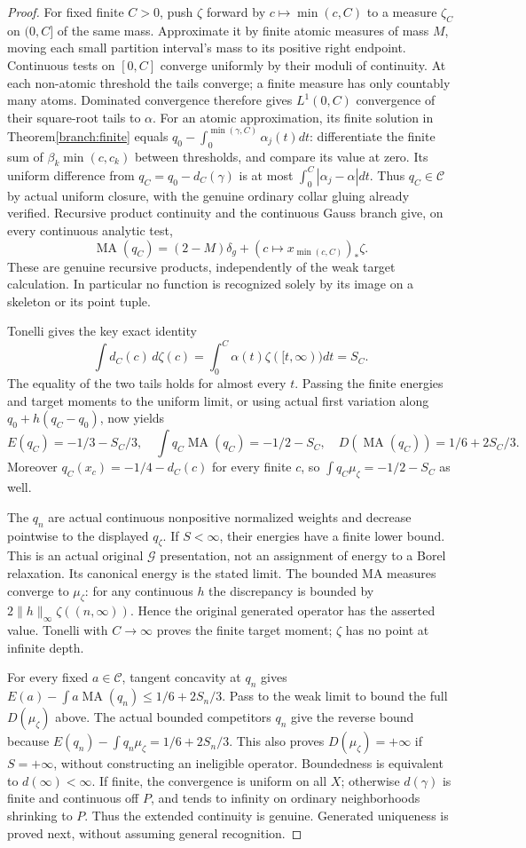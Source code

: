 \documentclass[11pt]{article}
\newcommand{\MA}{\operatorname{MA}}
\newcommand{\C}{\mathcal C}
\begin{document}
\begin{proof}
For fixed finite $C>0$, push $\zeta$ forward by $c\mapsto\min(c,C)$
to a measure $\zeta_C$ on $(0,C]$ of the same mass. Approximate it by
finite atomic measures of mass $M$, moving each small partition interval's
mass to its positive right endpoint. Continuous tests on $[0,C]$ converge
uniformly by their moduli of continuity. At each non-atomic threshold the
tails converge; a finite measure has only countably many atoms. Dominated
convergence therefore gives $L^1(0,C)$ convergence of their square-root
tails to $\alpha$. For an atomic approximation, its finite solution in
Theorem\ref{branch:finite} equals $q_0-\int_0^{\min(\gamma,C)}\alpha_j(t)dt$:
differentiate the finite sum of $\beta_k\min(c,c_k)$ between thresholds,
and compare its value at zero. Its uniform difference from
$q_C=q_0-d_C(\gamma)$ is at most $\int_0^C|\alpha_j-\alpha|dt$.
Thus $q_C\in\C$ by actual uniform closure, with the genuine ordinary
collar gluing already verified. Recursive product continuity and the
continuous Gauss branch give, on every continuous analytic test,
\[
 \MA(q_C)=(2-M)\delta_g+(c\mapsto x_{\min(c,C)})_*\zeta.
\]
These are genuine recursive products, independently of the weak target
calculation. In particular no function is recognized solely by its image
on a skeleton or its point tuple.

Tonelli gives the key exact identity
\[
 \int d_C(c)\,d\zeta(c)
 =\int_0^C\alpha(t)\zeta([t,\infty))dt=S_C.
\]
The equality of the two tails holds for almost every $t$. Passing the
finite energies and target moments to the uniform limit, or using actual
first variation along $q_0+h(q_C-q_0)$, now yields
\[
 E(q_C)=-1/3-S_C/3,\quad \int q_C\MA(q_C)=-1/2-S_C,
 \quad D(\MA(q_C))=1/6+2S_C/3.
\]
Moreover $q_C(x_c)=-1/4-d_C(c)$ for every finite $c$, so
$\int q_C\mu_\zeta=-1/2-S_C$ as well.

The $q_n$ are actual continuous nonpositive normalized weights and decrease
pointwise to the displayed $q_\zeta$. If $S<\infty$, their energies have a
finite lower bound. This is an actual original $\mathcal G$ presentation,
not an assignment of energy to a Borel relaxation. Its canonical energy
is the stated limit. The bounded MA measures converge to $\mu_\zeta$:
for any continuous $h$ the discrepancy is bounded by
$2\|h\|_\infty\zeta((n,\infty))$. Hence the original generated operator
has the asserted value. Tonelli with $C\to\infty$ proves the finite target
moment; $\zeta$ has no point at infinite depth.

For every fixed $a\in\C$, tangent concavity at $q_n$ gives
$E(a)-\int a\MA(q_n)\le1/6+2S_n/3$. Pass to the weak limit to bound the
full $D(\mu_\zeta)$ above. The actual bounded competitors $q_n$ give the
reverse bound because $E(q_n)-\int q_n\mu_\zeta=1/6+2S_n/3$.
This also proves $D(\mu_\zeta)=+\infty$ if $S=+\infty$, without constructing
an ineligible operator. Boundedness is equivalent to $d(\infty)<\infty$.
If finite, the convergence is uniform on all $X$; otherwise $d(\gamma)$
is finite and continuous off $P$, and tends to infinity on ordinary
neighborhoods shrinking to $P$. Thus the extended continuity is genuine.
Generated uniqueness is proved next, without assuming general recognition.
\end{proof}
\end{document}
